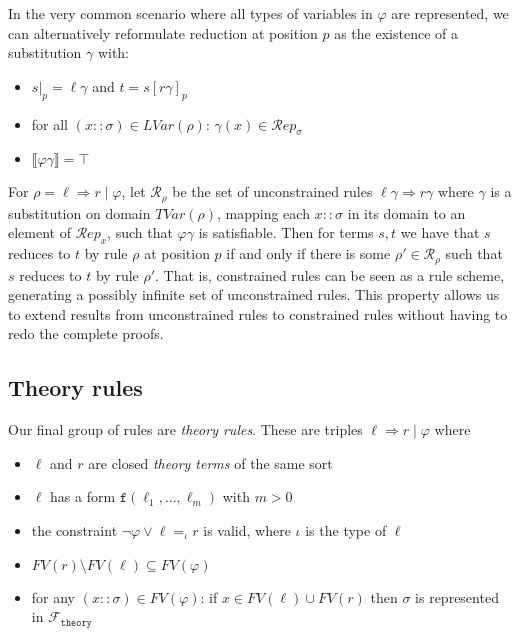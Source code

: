 \documentclass{lmcs}
\theoremstyle{theorem}\newtheorem{theorem}{Theorem}
\theoremstyle{theorem}\newtheorem{lemma}[theorem]{Lemma}
\theoremstyle{theorem}\newtheorem{corollary}[theorem]{Corollary}
\theoremstyle{definition}\newtheorem{definition}[theorem]{Definition}
\theoremstyle{definition}\newtheorem{example}[theorem]{Example}
\newcommand{\thF}{\mathcal{F}_{\mathtt{theory}}}
\newcommand{\thTypes}{\mathcal{Y}_{\mathtt{theory}}}
\newcommand{\Rules}{\mathcal{R}}
\newcommand{\FV}{\mathit{FV}}
\newcommand{\FMV}{\mathit{MV}}
\newcommand{\I}{\mathcal{I}}
\newcommand{\J}{\mathcal{J}}
\newcommand{\Reps}[1]{\mathcal{R}\!\mathit{ep}_{#1}}
\newcommand{\LVar}[1]{\mathit{LVar}(#1)}
\newcommand{\TLVar}[1]{\mathit{TVar}(#1)}
\newcommand{\asort}{\iota}
\newcommand{\atype}{\sigma}
\newcommand{\identifier}[1]{\mathtt{#1}}
\newcommand{\afun}{\identifier{f}}
\newcommand{\avar}{x}
\newcommand{\arrz}{\Rightarrow}
\newcommand{\interpret}[1]{\llbracket #1 \rrbracket}
\begin{document}
In the very common scenario where all types of variables in $\varphi$ are
represented, we can alternatively reformulate reduction at position $p$ as the
existence of a substitution $\gamma$ with:
\begin{itemize}
\item $s|_p = \ell\gamma$ and $t = s[r\gamma]_p$
\item for all $(\avar :: \atype) \in \LVar{\rho}$:
  $\gamma(\avar) \in \Reps{\atype}$
\item $\interpret{\varphi\gamma} = \top$
\end{itemize}

For $\rho = \ell \arrz r \mid \varphi$, let $\Rules_\rho$ be the set of
unconstrained rules $\ell\gamma \arrz r\gamma$ where $\gamma$ is a
substitution on domain $\TLVar{\rho}$, mapping each $\avar :: \atype$ in its
domain to an element of $\Reps{\avar}$, such that $\varphi\gamma$ is
satisfiable.
Then for terms $s,t$ we have that $s$ reduces to $t$ by rule $\rho$ at position
$p$ if and only if there is some $\rho' \in \Rules_\rho$ such that $s$ reduces
to $t$ by rule $\rho'$.  That is, constrained rules can be seen as a rule
scheme, generating a possibly infinite set of unconstrained rules.  This
property allows us to extend results from unconstrained rules to constrained
rules without having to redo the complete proofs.

\subsection{Theory rules}

Our final group of rules are \emph{theory rules}.  These are triples $\ell
\arrz r \mid \varphi$ where
\begin{itemize}
\item $\ell$ and $r$ are closed \emph{theory terms} of the same sort
\item $\ell$ has a form $\afun(\ell_1,\dots,\ell_m)$ with $m > 0$
\item the constraint $\neg \varphi \vee \ell =_\asort r$ is valid, where
  $\asort$ is the type of $\ell$
\item $\FV(r) \setminus \FV(\ell) \subseteq \FV(\varphi)$
\item for any $(\avar :: \atype) \in \FV(\varphi)$:
  if $\avar \in \FV(\ell) \cup \FV(r)$ then $\atype$ is represented in
  $\thF$
\end{itemize}
\end{document}
